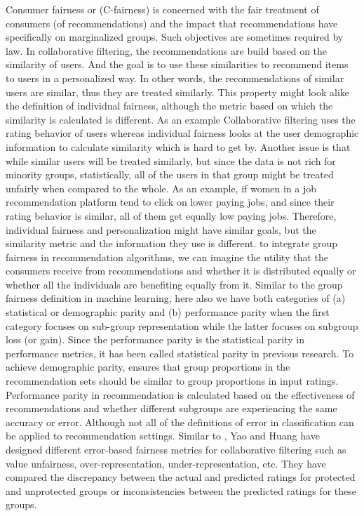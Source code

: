     Consumer fairness or (C-fairness) is concerned with the fair treatment of consumers (of recommendations) and the impact that recommendations have specifically on marginalized groups. Such objectives are sometimes required by law.
    In collaborative filtering, the recommendations are build based on the similarity of users. And the goal is to use these similarities to recommend items to users in a personalized way. In other words, the recommendations of similar users are similar, thus they are treated similarly. This property might look alike the definition of individual fairness, although the metric based on which the similarity is calculated is different. As an example
    Collaborative filtering uses the rating behavior of users whereas individual fairness looks at the user demographic information to calculate similarity which is hard to get by.
    Another issue is that while similar users will be treated similarly, but since the data is not rich for minority groups, statistically, all of the users in that group might be treated unfairly when compared to the whole.
    As an example, if women in a job recommendation platform tend to click on lower paying jobs, and since their rating behavior is similar, all of them get equally low paying jobs. Therefore, individual fairness and personalization might have similar goals, but the similarity metric and the information they use is different.
    to integrate group fairness in recommendation algorithms, we can imagine the utility that the consumers receive from recommendations and whether it is distributed equally or whether all the individuals are benefiting equally from it. Similar to the group fairness definition in machine learning, here also we have both categories of (a) statistical or demographic parity and (b) performance parity when the first category focuses on sub-group representation while the latter focuses on subgroup loss (or gain). Since the performance parity is the statistical parity in performance metrics, it has been called statistical parity in previous research.
    To achieve demographic parity, \cite{ekstrand2018exploring} ensures that group proportions in the recommendation sets should be similar to group proportions in input ratings. 
    Performance parity in recommendation is calculated based on the effectiveness of recommendations and whether different subgroups are experiencing the same accuracy or error. Although not all of the definitions of error in classification can be applied to recommendation settings. Similar to \cite{kamishima2016model}, Yao and Huang \cite{yao_huang_fatml-2017} have designed different error-based fairness metrics for collaborative filtering such as value unfairness, over-representation, under-representation, etc. They have compared the discrepancy between the actual and predicted ratings for protected and unprotected groups or inconsistencies between the predicted ratings for these groups. 
